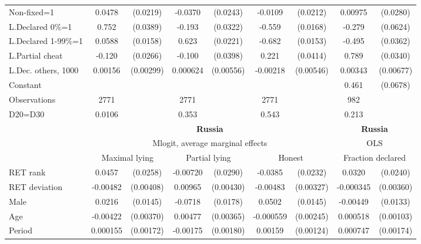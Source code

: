 \begin{tabular}{l|cccccc|cc}
Non-fixed=1     &   0.0478\sym{**} & (0.0219)&  -0.0370         & (0.0243)&  -0.0109         & (0.0212)&  0.00975         & (0.0280)\\
L.Declared 0\%=1&    0.752\sym{***}& (0.0389)&   -0.193\sym{***}& (0.0322)&   -0.559\sym{***}& (0.0168)&   -0.279\sym{***}& (0.0624)\\
L.Declared 1-99\%=1&   0.0588\sym{***}& (0.0158)&    0.623\sym{***}& (0.0221)&   -0.682\sym{***}& (0.0153)&   -0.495\sym{***}& (0.0362)\\
L.Partial cheat &   -0.120\sym{***}& (0.0266)&   -0.100\sym{**} & (0.0398)&    0.221\sym{***}& (0.0414)&    0.789\sym{***}& (0.0340)\\
L.Dec. others, 1000&  0.00156         &(0.00299)& 0.000624         &(0.00556)& -0.00218         &(0.00546)&  0.00343         &(0.00677)\\
Constant        &                  &         &                  &         &                  &         &    0.461\sym{***}& (0.0678)\\
\hline
Observations    &     2771         &         &     2771         &         &     2771         &         &      982         &         \\
D20=D30         &   0.0106         &         &    0.353         &         &    0.543         &         &    0.213         &         \\
\hline\hline
&\multicolumn{6}{c|}{\bf Russia}&\multicolumn{2}{c}{\bf Russia}\\ &\multicolumn{6}{c|}{Mlogit, average marginal effects }&\multicolumn{2}{c}{OLS}\\
                &\multicolumn{2}{c}{Maximal lying}&\multicolumn{2}{c}{Partial lying}&\multicolumn{2}{c}{Honest}  &\multicolumn{2}{c}{Fraction declared}\\
\hline
RET rank        &   0.0457\sym{*}  & (0.0258)& -0.00720         & (0.0290)&  -0.0385\sym{*}  & (0.0232)&   0.0320         & (0.0240)\\
RET deviation   & -0.00482         &(0.00408)&  0.00965\sym{**} &(0.00430)& -0.00483         &(0.00327)&-0.000345         &(0.00360)\\
Male            &   0.0216         & (0.0145)&  -0.0718\sym{***}& (0.0178)&   0.0502\sym{***}& (0.0145)& -0.00449         & (0.0133)\\
Age             & -0.00422         &(0.00370)&  0.00477         &(0.00365)&-0.000559         &(0.00245)& 0.000518         &(0.00103)\\
Period          & 0.000155         &(0.00172)& -0.00175         &(0.00180)&  0.00159         &(0.00124)& 0.000747         &(0.00174)\\

\end{tabular}
